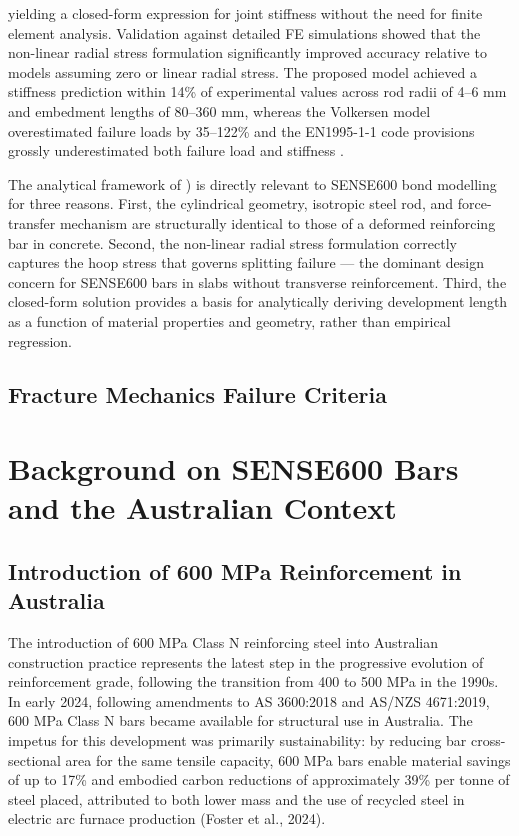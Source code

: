 yielding a closed-form expression for joint stiffness without the need for finite element analysis. Validation against detailed FE simulations showed that the non-linear radial stress formulation significantly improved accuracy relative to models assuming zero or linear radial stress. The proposed model achieved a stiffness prediction within 14\% of experimental values across rod radii of 4–6 mm and embedment lengths of 80–360 mm, whereas the Volkersen model overestimated failure loads by 35–122\% and the EN1995-1-1 code provisions grossly underestimated both failure load and stiffness \parencite{alaviAnalyticalProcedureFailure2025}.

The analytical framework of \textcite{alaviAnalyticalProcedureFailure2025}) is directly relevant to SENSE600 bond modelling for three reasons. First, the cylindrical geometry, isotropic steel rod, and force-transfer mechanism are structurally identical to those of a deformed reinforcing bar in concrete. Second, the non-linear radial stress formulation correctly captures the hoop stress that governs splitting failure — the dominant design concern for SENSE600 bars in slabs without transverse reinforcement. Third, the closed-form solution provides a basis for analytically deriving development length as a function of material properties and geometry, rather than empirical regression.

\subsection{Fracture Mechanics Failure Criteria}

\section{Background on SENSE600 Bars and the Australian Context}
\subsection{Introduction of 600 MPa Reinforcement in Australia}
The introduction of 600 MPa Class N reinforcing steel into Australian construction practice represents the latest step in the progressive evolution of reinforcement grade, following the transition from 400 to 500 MPa in the 1990s. In early 2024, following amendments to AS 3600:2018 and AS/NZS 4671:2019, 600 MPa Class N bars became available for structural use in Australia. The impetus for this development was primarily sustainability: by reducing bar cross-sectional area for the same tensile capacity, 600 MPa bars enable material savings of up to 17\% and embodied carbon reductions of approximately 39\% per tonne of steel placed, attributed to both lower mass and the use of recycled steel in electric arc furnace production (Foster et al., 2024).

